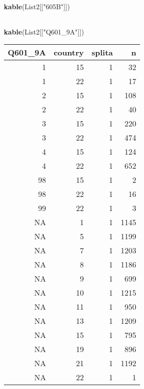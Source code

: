 \documentclass[]{article}
\newenvironment{Shaded}{\begin{snugshade}}{\end{snugshade}}
\newcommand{\KeywordTok}[1]{\textcolor[rgb]{0.13,0.29,0.53}{\textbf{#1}}}
\newcommand{\NormalTok}[1]{#1}
\newcommand{\StringTok}[1]{\textcolor[rgb]{0.31,0.60,0.02}{#1}}
\begin{document}
\begin{Shaded}
\begin{Highlighting}[]
\KeywordTok{kable}\NormalTok{(List2[[}\StringTok{"605B"}\NormalTok{]])}
\end{Highlighting}
\end{Shaded}

\begin{tabular}{}
\hline

\hline
\end{tabular}

\begin{Shaded}
\begin{Highlighting}[]
\KeywordTok{kable}\NormalTok{(List2[[}\StringTok{"Q601_9A"}\NormalTok{]])}
\end{Highlighting}
\end{Shaded}

\begin{tabular}{r|r|r|r}
\hline
Q601\_9A & country & splita & n\\
\hline
1 & 15 & 1 & 32\\
\hline
1 & 22 & 1 & 17\\
\hline
2 & 15 & 1 & 108\\
\hline
2 & 22 & 1 & 40\\
\hline
3 & 15 & 1 & 220\\
\hline
3 & 22 & 1 & 474\\
\hline
4 & 15 & 1 & 124\\
\hline
4 & 22 & 1 & 652\\
\hline
98 & 15 & 1 & 2\\
\hline
98 & 22 & 1 & 16\\
\hline
99 & 22 & 1 & 3\\
\hline
NA & 1 & 1 & 1145\\
\hline
NA & 5 & 1 & 1199\\
\hline
NA & 7 & 1 & 1203\\
\hline
NA & 8 & 1 & 1186\\
\hline
NA & 9 & 1 & 699\\
\hline
NA & 10 & 1 & 1215\\
\hline
NA & 11 & 1 & 950\\
\hline
NA & 13 & 1 & 1209\\
\hline
NA & 15 & 1 & 795\\
\hline
NA & 19 & 1 & 896\\
\hline
NA & 21 & 1 & 1192\\
\hline
NA & 22 & 1 & 1\\
\hline
\end{tabular}
\end{document}

